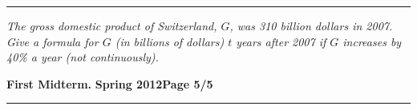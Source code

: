\documentclass[12pt]{article}
\begin{document}
\begin{flushright}
\end{flushright}
\hrule
{\problem[10 pts] \em The gross domestic product of Switzerland, $G$,
  was 310 billion dollars in 2007.  Give a formula for $G$ (in
  billions of dollars) $t$ years after 2007 if $G$ increases by 40\% a
  year (not continuously).}
\vspace{4cm}
\begin{flushright}
\end{flushright}
\newpage

\hfill{\large\bf First Midterm.}\hfill{\large\bf
  Spring 2012}\hfill{\large\bf Page 5/5}\hrule
\end{document}
